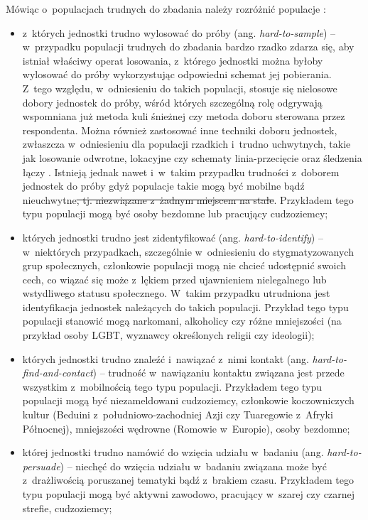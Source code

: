 \documentclass[12pt,a4paper]{article}
\providecommand{\DIFdel}[1]{{\protect\color{red}\sout{#1}}}                      %
\providecommand{\DIFdelbegin}{} %
\providecommand{\DIFdelend}{} %
\begin{document}
Mówiąc o~populacjach trudnych do zbadania należy rozróżnić populacje \citep{tourangeau2014hard}:
\begin{itemize}
\item z~których jednostki trudno wylosować do próby (ang. \textit{hard-to-sample}) -- w~przypadku populacji trudnych do zbadania bardzo rzadko zdarza się, aby istniał właściwy operat losowania, z~którego jednostki można byłoby wylosować do próby wykorzystując odpowiedni schemat jej pobierania. Z~tego względu, w~odniesieniu do takich populacji, stosuje się nielosowe dobory jednostek do próby, wśród których szczególną rolę odgrywają wspomniana już metoda kuli śnieżnej czy metoda doboru sterowana przez respondenta. Można również zastosować inne techniki doboru jednostek, zwłaszcza w~odniesieniu dla populacji rzadkich i~trudno uchwytnych, takie jak losowanie odwrotne, lokacyjne czy schematy linia-przecięcie oraz śledzenia łączy \citep{jedkub}. Istnieją jednak nawet i~w~takim przypadku trudności z~doborem jednostek do próby gdyż populacje takie mogą być mobilne bądź nieuchwytne\DIFdelbegin \DIFdel{, tj. niezwiązane z~żadnym miejscem na stałe}\DIFdelend . Przykładem tego typu populacji mogą być osoby bezdomne lub pracujący cudzoziemcy;
\item których jednostki trudno jest zidentyfikować (ang. \textit{hard-to-identify}) --  w~niektórych przypadkach, szczególnie w~odniesieniu do stygmatyzowanych grup społecznych, członkowie populacji mogą nie chcieć udostępnić swoich cech, co wiązać się może z~lękiem przed ujawnieniem nielegalnego lub wstydliwego statusu społecznego. W~takim przypadku utrudniona jest identyfikacja jednostek należących do takich populacji. Przykład tego typu populacji stanowić mogą narkomani, alkoholicy czy różne mniejszości (na przykład osoby LGBT, wyznawcy określonych religii czy ideologii);
\item których jednostki trudno znaleźć i~nawiązać z~nimi kontakt (ang. \textit{hard-to-find-and-contact}) -- trudność w~nawiązaniu kontaktu związana jest przede wszystkim z~mobilnością tego typu populacji. Przykładem tego typu populacji mogą być niezameldowani cudzoziemcy, członkowie koczowniczych kultur (Beduini z~południowo-zachodniej Azji czy Tuaregowie z~Afryki Północnej), mniejszości wędrowne (Romowie w~Europie), osoby bezdomne;  
\item której jednostki trudno namówić do wzięcia udziału w~badaniu (ang. \textit{hard-to-per\-su\-ade}) -- niechęć do wzięcia udziału w~badaniu związana może być z~drażliwością poruszanej tematyki bądź z~brakiem czasu. Przykładem tego typu populacji mogą być aktywni zawodowo, pracujący w~szarej czy czarnej strefie, cudzoziemcy;

\end{itemize}
\end{document}
